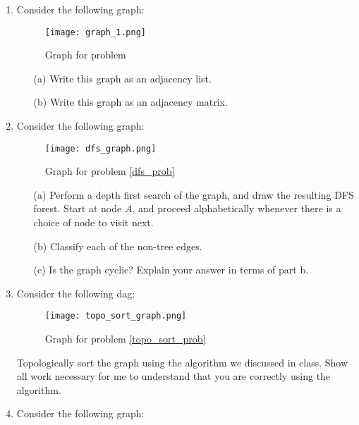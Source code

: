 \documentclass[12pt]{article}
\begin{document}
\begin{enumerate}
    \newpage
    \item Consider the following graph:
    \begin{center}
    \begin{figure}[h]
        \caption{Graph for problem }
        \texttt{[image: graph\_1.png]}
    \end{figure}
    \end{center}
    \begin{itemize}
        \item[(a)] Write this graph as an adjacency list.
        \item[(b)] Write this graph as an adjacency matrix.
    \end{itemize}
    \newpage
    \item Consider the following graph: 
    \begin{center}
    \begin{figure}[h]
        \caption{Graph for problem \ref{dfs_prob}}
    \texttt{[image: dfs\_graph.png]}
    \end{figure}
    \end{center}
    \begin{itemize}
        \item[(a)] Perform a depth first search of the graph, and draw the resulting DFS forest. Start at node $A$, and proceed alphabetically whenever there is a choice of node to visit next. 
        \item[(b)] Classify each of the non-tree edges.  
        \item[(c)] Is the graph cyclic? Explain your answer in terms of part b. 
    \end{itemize}
    \label{dfs_prob}
    \newpage
    \item Consider the following dag:
    \begin{center}
    \begin{figure}[h]
        \caption{Graph for problem \ref{topo_sort_prob}}
        \texttt{[image: topo\_sort\_graph.png]}
    \end{figure}
    \end{center}
    \newline
    Topologically sort the graph using the algorithm we discussed in class. Show all work necessary for me to understand that you are correctly using the algorithm. 
    \label{topo_sort_prob}
    \newpage
    \item Consider the following graph: \label{bfs}
    \begin{center}

\end{center}
\end{enumerate}
\end{document}

